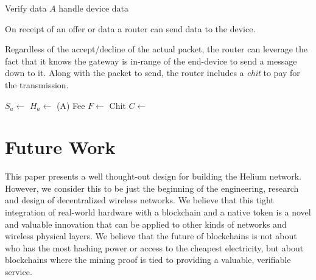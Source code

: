 \documentclass[10pt, nonatbib, nocopyrightspace, reprint]{sigplanconf}
\begin{document}
\begin{description}
\begin{algorithm}[!htb]
       {
        Verify data $A$ \;
        handle device data \;
      }
    \end{algorithm}
    \FloatBarrier


    \item [Send Data] On receipt of an offer or data a router can send data to the device.

      Regardless of the accept/decline of the actual packet, the router can leverage the fact that it knows the gateway is in-range of the end-device to send a message down to it. Along with the packet to send, the router includes a \emph{chit} to pay for the transmission.

    \begin{algorithm}[!htb]
      \DontPrintSemicolon
      \caption{Router Send Data }\label{proto:router.data.send}

       {
        $S_a \leftarrow $  \;
        $H_a \leftarrow $ \Hash(A) \;
        Fee $F \leftarrow $  \;
        Chit $C \leftarrow $  \;
         \;
      }
    \end{algorithm}
    \FloatBarrier

\end{description}

\section{Future Work}

This paper presents a well thought-out design for building the Helium network. However, we consider this to be just the beginning of the engineering, research and design of decentralized wireless networks. We believe that this tight integration of real-world hardware with a blockchain and a native token is a novel and valuable innovation that can be applied to other kinds of networks and wireless physical layers. We believe that the future of blockchains is not about who has the most hashing power or access to the cheapest electricity, but about blockchains where the mining proof is tied to providing a valuable, verifiable service. 
\end{document}
